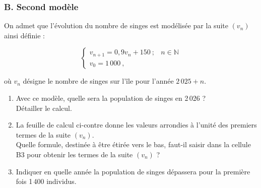 \documentclass[10pt]{article}
\providecommand{\N}{\mathbb{N}}
\begin{document}
\begin{minipage}[t]{0.75\textwidth}
\subsubsection*{B. Second modèle}
On admet que l'évolution du nombre de singes est modélisée par la suite $(v_n)$ ainsi définie :

\[
\begin{cases}
v_{n+1} = 0,9v_n + 150~; & n \in \N \\
v_0 = 1\,000~,
\end{cases}
\]

où $v_n$ désigne le nombre de singes sur l'île pour l'année $2\,025 + n$.

\begin{enumerate}
\item Avec ce modèle, quelle sera la population de singes en 2\,026 ? \\
Détailler le calcul.

\item La feuille de calcul ci-contre donne les valeurs arrondies à l'unité des premiers termes de la suite $(v_n)$. \\
Quelle formule, destinée à être étirée vers le bas, faut-il saisir dans la cellule B3 pour obtenir les termes de la suite $(v_n)$ ?

\item Indiquer en quelle année la population de singes dépassera pour la première fois 1\,400 individus.
\end{enumerate}
\end{minipage}
\hfill
\end{document}
